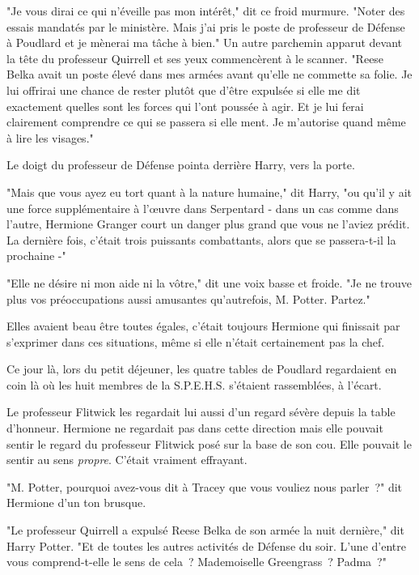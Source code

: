 "Je vous dirai ce qui n'éveille pas mon intérêt," dit ce froid murmure. "Noter des essais mandatés par le ministère. Mais j'ai pris le poste de professeur de Défense à Poudlard et je mènerai ma tâche à bien." Un autre parchemin apparut devant la tête du professeur Quirrell et ses yeux commencèrent à le scanner. "Reese Belka avait un poste élevé dans mes armées avant qu'elle ne commette sa folie. Je lui offrirai une chance de rester plutôt que d'être expulsée si elle me dit exactement quelles sont les forces qui l'ont poussée à agir. Et je lui ferai clairement comprendre ce qui se passera si elle ment. Je m'autorise quand même à lire les visages."

Le doigt du professeur de Défense pointa derrière Harry, vers la porte.

"Mais que vous ayez eu tort quant à la nature humaine," dit Harry, "ou qu'il y ait une force supplémentaire à l'œuvre dans Serpentard - dans un cas comme dans l'autre, Hermione Granger court un danger plus grand que vous ne l'aviez prédit. La dernière fois, c'était trois puissants combattants, alors que se passera-t-il la prochaine -"

"Elle ne désire ni mon aide ni la vôtre," dit une voix basse et froide. "Je ne trouve plus vos préoccupations aussi amusantes qu'autrefois, M. Potter. Partez."

\later

Elles avaient beau être toutes égales, c'était toujours Hermione qui finissait par s'exprimer dans ces situations, même si elle n'était certainement pas la chef.

Ce jour là, lors du petit déjeuner, les quatre tables de Poudlard regardaient en coin là où les huit membres de la S.P.E.H.S. s'étaient rassemblées, à l'écart.

Le professeur Flitwick les regardait lui aussi d'un regard sévère depuis la table d'honneur. Hermione ne regardait pas dans cette direction mais elle pouvait sentir le regard du professeur Flitwick posé sur la base de son cou. Elle pouvait le sentir au sens \emph{propre}. C'était vraiment effrayant.

"M. Potter, pourquoi avez-vous dit à Tracey que vous vouliez nous parler~?" dit Hermione d'un ton brusque.

"Le professeur Quirrell a expulsé Reese Belka de son armée la nuit dernière," dit Harry Potter. "Et de toutes les autres activités de Défense du soir. L'une d'entre vous comprend-t-elle le sens de cela~? Mademoiselle Greengrass~? Padma~?"

